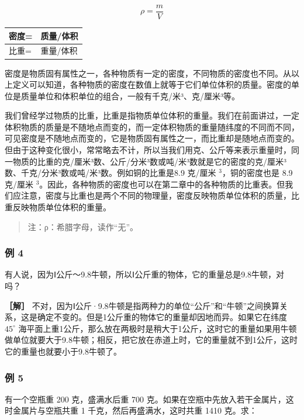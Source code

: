 \[
\rho = \frac {m}{V}
\]

{\def\LTcaptype{none} %
\begin{longtable}[]{@{}ll@{}}
\toprule\noalign{}
密度= & 质量/体积 \\
\midrule\noalign{}
\endhead
\bottomrule\noalign{}
\endlastfoot
比重= & 重量/体积 \\
\end{longtable}
}

密度是物质固有属性之一，各种物质有一定的密度，不同物质的密度也不同。从以上定义可以知道，各种物质的密度在数值上就等于它们单位体积的质量。密度的单位是质量单位和体积单位的组合，一般有千克/米³、克/厘米³等。

我们曾经学过物质的比重，比重是指物质单位体积的重量。我们在前面讲过，一定体积物质的质量是不随地点而变的，而一定体积物质的重量随纬度的不同而不同，可见密度是不随地点而变的，它是物质固有属性之一，而比重却是随地点而变的。但由于这种变化很小，常常略去不计，所以当我们用克、公斤等来表示重量时，同一物质的比重的克/厘米³数、公斤/分米³数或吨/米³数就是它的密度的克/厘米³数、千克/分米³数或吨/米³数。例如铜的比重是8.9
克/厘米 \(^{3}\)，铜的密度也是 8.9 克/厘米
\(^{3}\)。因此，各种物质的密度也可以在第二章中的各种物质的比重表。但我们应注意，密度与比重也是两个不同的物理量，密度反映物质单位体积的质量，比重反映物质单位体积的重量。

\begin{quote}
注：ρ：希腊字母，读作``无''。
\end{quote}

\subsubsection{例 4}\label{ux4f8b-4-5}

有人说，因为Ⅰ公斤～9.8牛顿，所以Ⅰ公斤重的物体，它的重量总是9.8牛顿，对吗？

\textbf{［解］}
不对，因为Ⅰ公斤·9.8牛顿是指两种力的单位``公斤''和``牛顿''之间换算关系，这是确定不变的。但是1公斤重的物体它的重量却因地而异。如果它在纬度
\(45^{\circ}\)
海平面上重1公斤，那么放在两极时是稍大于1公斤，这时它的重量如果用牛顿做单位就要大于9.8牛顿；相反，把它放在赤道上时，它的重量就不到1公斤，这时它的重量也就要小于9.8牛顿了。

\subsubsection{例 5}\label{ux4f8b-5-4}

有一个空瓶重 200 克，盛满水后重 700
克。如果在空瓶中先放入若干金属片，这时金属片与空瓶共重 1
千克，然后再盛满水，这时共重 1410 克。求：

